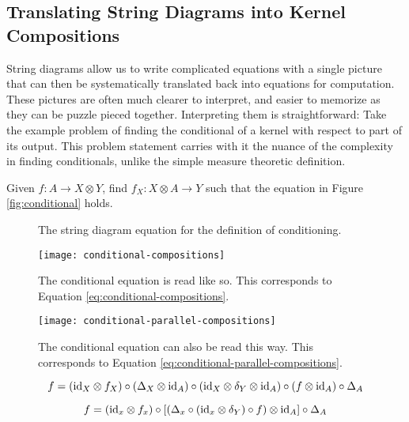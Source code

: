 \subsection{Translating String Diagrams into Kernel Compositions}
String diagrams allow us to write complicated equations with a single picture that can then be systematically translated back into equations for computation.
These pictures are often much clearer to interpret, and easier to memorize as they can be puzzle pieced together.
Interpreting them is straightforward: Take the example problem of finding the conditional of a kernel with respect to part of its output.
This problem statement carries with it the nuance of the complexity in finding conditionals, unlike the simple measure theoretic definition.

Given $f:A\rightarrow X\otimes Y$, find $f_X : X\otimes A \rightarrow Y$ such that the equation in Figure \ref{fig:conditional} holds.

\begin{figure}[htb]
	\centering
	\caption{The string diagram equation for the definition of conditioning.}
	\label{tikz:conditional}
\end{figure}

\begin{figure}[htb]
	\centering
	\texttt{[image: conditional-compositions]}
	\caption{The conditional equation is read like so. This corresponds to Equation \ref{eq:conditional-compositions}.}
	\label{fig:conditional-compositions}
\end{figure}

\begin{figure}[htb]
	\centering
	\texttt{[image: conditional-parallel-compositions]}
	\caption{The conditional equation can also be read this way. This corresponds to Equation \ref{eq:conditional-parallel-compositions}.}
	\label{fig:conditional-parallel-compositions}
\end{figure}

\begin{equation}
\label{eq:conditional-compositions}
f = (\mathrm{id}_X \otimes f_X) \circ (\Delta_X \otimes \mathrm{id}_A)
\circ (\mathrm{id}_X \otimes \delta_Y \otimes \mathrm{id}_A) \circ (f \otimes \mathrm{id}_A) \circ \Delta_A
\end{equation}

\begin{equation}
\label{eq:conditional-parallel-compositions}
f = (\mathrm{id}_x \otimes f_x) \circ \left[\left(\Delta_x \circ (\mathrm{id}_x\otimes \delta_Y) \circ f\right) \otimes \mathrm{id}_A\right] \circ \Delta_A
\end{equation}

